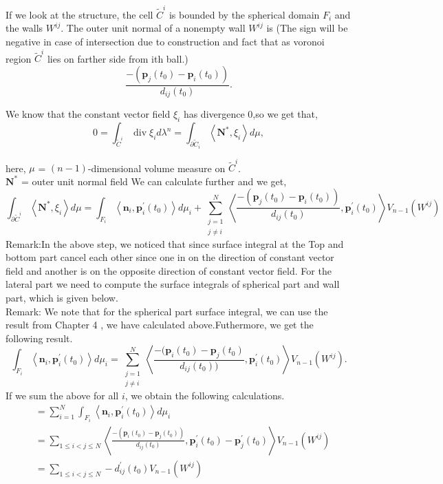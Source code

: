 If we look at the structure, the cell $\tilde{C}^{i}$ is bounded by the spherical domain $F_{i}$ and the walls $W^{i j}$. The outer unit normal of a nonempty wall $W^{i j}$ is (The sign will be negative in case of intersection due to construction and fact that as voronoi region $\tilde{C}^{i}$ lies on farther side from ith ball.)
$$
\frac{-(\mathbf{p}_{j}\left(t_{0}\right)-\mathbf{p}_{i}\left(t_{0}\right))}{d_{i j}\left(t_{0}\right)} .
$$

We know that the constant vector field $\xi_{i}$ has divergence 0,so  we get that,
$$
0=\int_{\tilde{C}^{i}} \operatorname{div} \xi_{i} d \lambda^{n}=\int_{\partial \tilde{C}_{i}}\left\langle\mathbf{N}^*, \xi_{i}\right\rangle d \mu,
$$

here, $\mu$ =  $(n-1)$-dimensional volume measure on $\tilde{C}^{i}$.\\
     $\mathbf{N}^*$ = outer unit normal field
 We can calculate further and we get,
$$
\int_{\partial \tilde{C}^{i}}\left\langle\mathbf{N}^*, \xi_{i}\right\rangle d \mu=\int_{F_{i}}\left\langle\mathbf{n}_{i}, \mathbf{p}_{i}^{\prime}\left(t_{0}\right)\right\rangle d \mu_{i}+\sum_{\substack{j=1 \\ j \neq i}}^{N}\left\langle\frac{-(\mathbf{p}_{j}\left(t_{0}\right)-\mathbf{p}_{i}\left(t_{0}\right))}{d_{i j}\left(t_{0}\right)}, \mathbf{p}_{i}^{\prime}\left(t_{0}\right)\right\rangle V_{n-1}\left(W^{i j}\right)
$$
Remark:In the above step, we noticed that since surface integral at the Top and bottom part cancel each other since one in on the direction of constant vector field and another is on the opposite direction of constant vector field. For the lateral part we need to compute the surface integrals of spherical part and wall part, which is given below. \\
Remark: We note that for the spherical part surface integral, we can use the result from Chapter 4 , we have calculated above.Futhermore, we get the following result. 
$$
\int_{F_{i}}\left\langle\mathbf{n}_{i}, \mathbf{p}_{i}^{\prime}\left(t_{0}\right)\right\rangle d \mu_{i}=\sum_{\substack{j=1 \\ j \neq i}}^{N}\left\langle\frac{-(\mathbf{p}_{i}\left(t_{0}\right)-\mathbf{p}_{j}\left(t_{0}\right)}{d_{i j}\left(t_{0}\right))}, \mathbf{p}_{i}^{\prime}\left(t_{0}\right)\right\rangle V_{n-1}\left(W^{i j}\right) .
$$
If we sum the above  for all $i$, we obtain the following calculations.
$$
\begin{aligned}
 & =\sum_{i=1}^{N} \int_{F_{i}}\left\langle\mathbf{n}_{i}, \mathbf{p}_{i}^{\prime}\left(t_{0}\right)\right\rangle d \mu_{i} \\
& =\sum_{1 \leq i<j \leq N}\left\langle\frac{-(\mathbf{p}_{i}\left(t_{0}\right)-\mathbf{p}_{j}\left(t_{0}\right))}{d_{i j}\left(t_{0}\right)}, \mathbf{p}_{i}^{\prime}\left(t_{0}\right)-\mathbf{p}_{j}^{\prime}\left(t_{0}\right)\right\rangle V_{n-1}\left(W^{i j}\right) \\
& =\sum_{1 \leq i<j \leq N} -d_{i j}^{\prime}\left(t_{0}\right) V_{n-1}\left(W^{i j}\right)
\end{aligned}
$$

